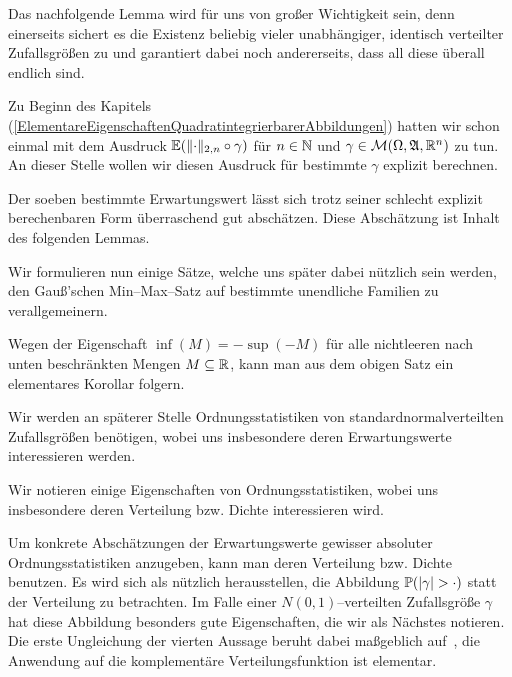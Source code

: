 \documentclass[a4paper]{report}
\numberwithin[\roman]{equation}{sat}
\begin{document}

\parag
Das nachfolgende Lemma wird für uns von großer Wichtigkeit sein, denn
einerseits sichert es die Existenz beliebig vieler unabhängiger, identisch
verteilter Zufallsgrößen zu und garantiert dabei noch andererseits, dass all
diese überall endlich sind.






\parag
Zu Beginn des Kapitels
(\ref{ElementareEigenschaftenQuadratintegrierbarerAbbildungen})
hatten wir schon einmal mit dem Ausdruck  $\mathbb{E}(\lVert\cdot\rVert_{2,n}\circ\gamma)$
für $n \in \mathbb{N}$ und $\gamma \in \mathcal{M}(\Omega, \mathfrak{A}, \mathbb{R}^n)$ zu tun. An dieser
Stelle wollen wir diesen Ausdruck für bestimmte $\gamma$ explizit berechnen.


\parag
Der soeben bestimmte Erwartungswert lässt sich trotz seiner schlecht explizit
berechenbaren Form überraschend gut abschätzen.
Diese Abschätzung ist Inhalt des folgenden Lemmas.


\parag
Wir formulieren nun einige Sätze, welche uns später dabei nützlich sein werden,
den Gauß'schen Min--Max--Satz auf bestimmte unendliche Familien zu
verallgemeinern.

\parag
Wegen der Eigenschaft $\inf(M) = -\sup (-M)$ für alle nichtleeren nach unten
beschränkten Mengen $M \subseteq \mathbb{R}$, kann man aus dem obigen Satz ein
elementares Korollar folgern.






\parag
Wir werden an späterer Stelle Ordnungsstatistiken von
standardnormalverteilten Zufallsgrößen benötigen, wobei uns insbesondere
deren Erwartungswerte interessieren werden.


\parag
Wir notieren einige Eigenschaften von Ordnungsstatistiken, wobei uns
insbesondere deren Verteilung bzw. Dichte interessieren wird.



Um konkrete Abschätzungen der Erwartungswerte gewisser absoluter
Ordnungsstatistiken anzugeben, kann man deren Verteilung bzw. Dichte benutzen.
Es wird sich als nützlich herausstellen, die Abbildung
$\mathbb{P}(\left|\gamma\right| > \cdot)$ statt der Verteilung zu betrachten.
Im Falle
einer $N(0, 1)$--verteilten Zufallsgröße $\gamma$ hat diese Abbildung
besonders gute Eigenschaften, die wir als Nächstes notieren.
Die erste Ungleichung der vierten Aussage beruht dabei maßgeblich auf~\cite{RW}, die
Anwendung auf die komplementäre Verteilungsfunktion ist elementar.
\end{document}
